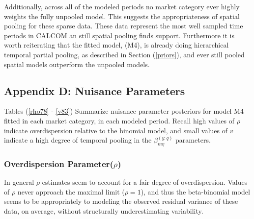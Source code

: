 \documentclass[12pt]{article}
\begin{document}
Additionally, across all of the modeled periods no market category ever highly 
weights the fully unpooled model. This suggests the appropriateness of spatial 
pooling for these sparse data. These data represent the most well sampled time 
periods in CALCOM an still spatial pooling finds support. Furthermore it is 
worth reiterating that the fitted model, (M4), is already doing hierarchical 
temporal partial pooling, as described in Section (\ref{priors}), and ever 
still pooled spatial models outperform the unpooled models.

%
\clearpage
%

\subsection{Appendix D: Nuisance Parameters}\label{appNu}

Tables (\ref{rho78} - \ref{v83}) Summarize nuisance parameter posteriors for model M4 fitted
in each market category, in each modeled period. Recall high values of
\(\rho\) indicate overdispersion relative to the binomial model, and
small values of \(v\) indicate a high degree of temporal pooling in the
\(\beta^{(y:q)}_{m\eta}\) parameters.

\subsubsection{Overdispersion Parameter(\(\rho\))}

In general \(\rho\) estimates seem to account for a fair degree of
overdispersion. Values of \(\rho\) never approach the maximal limit
(\(\rho=1\)), and thus the beta-binomial model seems to be appropriately
to modeling the observed residual variance of these data, on average,
without structurally underestimating variability.
\end{document}
